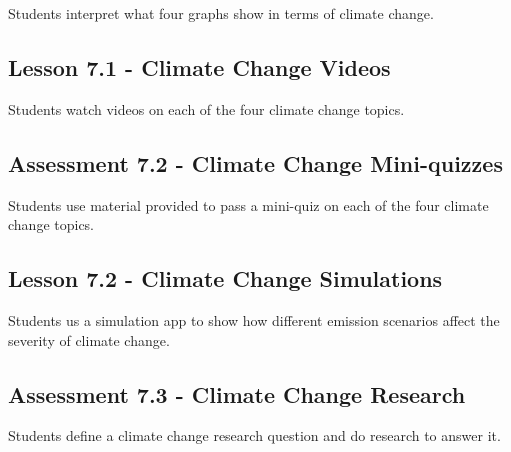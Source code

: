 \documentclass[12pt]{article}
\begin{document}
Students interpret what four graphs show in terms of climate change.

\subsection{Lesson 7.1 - Climate Change Videos}

Students watch videos on each of the four climate change topics.

\subsection*{Assessment 7.2 - Climate Change Mini-quizzes}

Students use material provided to pass a mini-quiz on each of the four climate change topics.

\subsection{Lesson 7.2 - Climate Change Simulations} 

Students us a simulation app to show how different emission scenarios affect the severity of climate change.

\subsection*{Assessment 7.3 - Climate Change Research}

Students define a climate change research question and do research to answer it.
\end{document}

